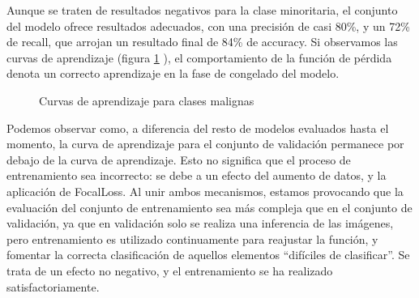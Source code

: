 Aunque se traten de resultados negativos para la clase minoritaria, el conjunto del modelo ofrece resultados  adecuados, con una precisión de casi 80\%, y un 72\% de recall, que arrojan un resultado final de 84\% de accuracy. Si observamos las curvas de aprendizaje (figura \ref{fig:curvasmalign} ), el comportamiento de la función de pérdida denota un correcto aprendizaje en la fase de congelado del modelo.

\begin{figure}[H]
	\centering
	\caption{Curvas de aprendizaje para clases malignas}
	\label{fig:curvasmalign}
\end{figure}

Podemos observar como, a diferencia del resto de modelos evaluados hasta el momento, la curva de aprendizaje para el conjunto de validación permanece por debajo de la curva de aprendizaje. Esto no significa que el proceso de entrenamiento sea incorrecto: se debe a un efecto del aumento de datos, y la aplicación de FocalLoss. Al unir ambos mecanismos, estamos provocando que la evaluación del conjunto de entrenamiento sea más compleja que en el conjunto de validación, ya que en validación solo se realiza una inferencia de las imágenes, pero entrenamiento es utilizado continuamente para reajustar la función, y fomentar la correcta clasificación de aquellos elementos ``difíciles de clasificar''. Se trata de un efecto no negativo, y el entrenamiento se ha realizado satisfactoriamente.

